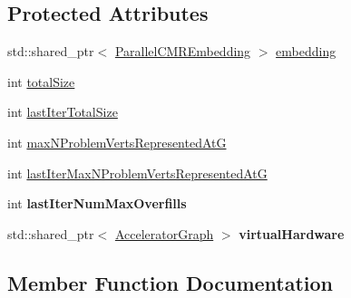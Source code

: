 \subsection*{Protected Attributes}
\begin{DoxyCompactItemize}
\item 
std\+::shared\+\_\+ptr$<$ \hyperlink{a00093}{Parallel\+C\+M\+R\+Embedding} $>$ \hyperlink{a00032_aa1dc893f548705b0866b369d2d6dde4c}{embedding}
\item 
int \hyperlink{a00032_ac394cc5299f299d2d441c0e1cb9b1d17}{total\+Size}
\item 
int \hyperlink{a00032_a5d970ff227505a02cee0a331df66f5a0}{last\+Iter\+Total\+Size}
\item 
int \hyperlink{a00032_a0bfae593986c4b99fcfc5c7d58cb03d3}{max\+N\+Problem\+Verts\+Represented\+AtG}
\item 
int \hyperlink{a00032_aa3a607bf9eeedbc43cfa37624ac57ecd}{last\+Iter\+Max\+N\+Problem\+Verts\+Represented\+AtG}
\item 
int {\bfseries last\+Iter\+Num\+Max\+Overfills}\hypertarget{a00032_ac0e7819659cf9966593050853b041b0a}{}\label{a00032_ac0e7819659cf9966593050853b041b0a}

\item 
std\+::shared\+\_\+ptr$<$ \hyperlink{a00064}{Accelerator\+Graph} $>$ {\bfseries virtual\+Hardware}\hypertarget{a00032_a9f20090240711be97766be35f05dd0bc}{}\label{a00032_a9f20090240711be97766be35f05dd0bc}

\end{DoxyCompactItemize}


\subsection{Member Function Documentation}
